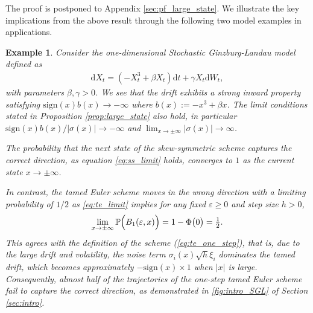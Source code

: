 \documentclass[11pt]{article}
\newtheorem{example}{Example}
\renewcommand{\d}{\mathrm{d}}
\begin{document}
The proof is postponed to Appendix \ref{sec:pf_large_state}. We illustrate the key implications from the above result through the following two model examples in applications.

\begin{example} \label{eg:ginzburg}
Consider the one-dimensional Stochastic Ginzburg-Landau model defined as
% 
\begin{align} \label{eq:SGL}
\d X_t = (- X_t^3 + \beta X_t) \d t + \gamma X_t \d W_t, 
\end{align}
% 
with parameters $\beta, \gamma > 0$. We see that the drift exhibits a strong inward property satisfying $\mathrm{sign} (x) b (x) \to - \infty$ where $b(x) := -x^3 + \beta x$. The limit conditions stated in Proposition \ref{prop:large_state} also hold, in particular $\mathrm{sign}(x) b (x)/ |\sigma (x)| \to - \infty$ and $\lim_{x \to \pm \infty} | \sigma (x) | \to \infty$.  

The probability that the next state of the skew-symmetric scheme captures the correct direction, as equation \eqref{eq:ss_limit} holds, converges to $1$ as the current state $x \to \pm \infty$. 

In contrast, the tamed Euler scheme moves in the wrong direction with a limiting probability of $1/2$ as \eqref{eq:te_limit} implies for any fixed $\varepsilon \ge 0$ and step size $h > 0$,  
% 
\begin{align*}
\lim_{x \to \pm \infty} \mathbb{P} \Bigl( B_1  (\varepsilon, x) \Bigr)
= 1 - \Phi \bigl( 0 \bigr) = \tfrac{1}{2}.
\end{align*}
% 
This agrees with the definition of the scheme (\ref{eq:te_one_step}), that is, due to the large drift and volatility, the noise term $\sigma_i (x) \sqrt{h} \xi_i$ dominates the tamed drift, which becomes approximately $- \mathrm{sign}(x)\times1$ when $|x|$ is large.  Consequently, almost half of the trajectories of the one-step tamed Euler scheme fail to capture the correct direction, as demonstrated in \cref{fig:intro_SGL} of Section \ref{sec:intro}. 
\end{example}
% 
\end{document}
